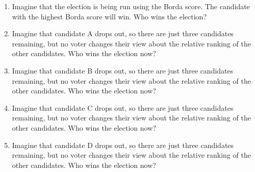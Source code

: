 \documentclass[11pt,]{article}
\providecommand{\tightlist}{%
  \setlength{\itemsep}{0pt}\setlength{\parskip}{0pt}}
\begin{document}
\begin{enumerate}
\def\labelenumi{\arabic{enumi}.}
\setcounter{enumi}{5}
\tightlist
\item
  Imagine that the election is being run using the Borda score. The
  candidate with the highest Borda score will win. Who wins the
  election?
\item
  Imagine that candidate A drops out, so there are just three candidates
  remaining, but no voter changes their view about the relative ranking
  of the other candidates. Who wins the election now?
\item
  Imagine that candidate B drops out, so there are just three candidates
  remaining, but no voter changes their view about the relative ranking
  of the other candidates. Who wins the election now?
\item
  Imagine that candidate C drops out, so there are just three candidates
  remaining, but no voter changes their view about the relative ranking
  of the other candidates. Who wins the election now?
\item
  Imagine that candidate D drops out, so there are just three candidates
  remaining, but no voter changes their view about the relative ranking
  of the other candidates. Who wins the election now?
\end{enumerate}
\end{document}
